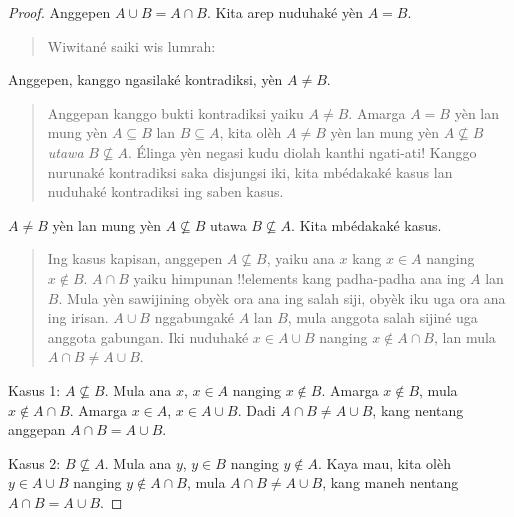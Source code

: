 \documentclass[../../../include/open-logic-section]{subfiles}
\begin{document}
\begin{proof}
  Anggepen $A \cup B = A \cap B$.
  Kita arep nuduhaké yèn $A = B$.
  \begin{quote}
    Wiwitané saiki wis lumrah:
  \end{quote}
  Anggepen, kanggo ngasilaké kontradiksi,
  yèn $A \neq B$.
  \begin{quote}
    Anggepan kanggo bukti kontradiksi yaiku
    $A \neq B$. Amarga $A = B$ yèn lan mung
    yèn $A \subseteq B$ lan $B \subseteq A$,
    kita olèh $A \neq B$ yèn lan mung yèn
    $A \nsubseteq B$ \emph{utawa}
    $B \nsubseteq
    A$. Élinga yèn negasi kudu diolah kanthi
    ngati-ati!{} Kanggo nurunaké kontradiksi
    saka disjungsi iki, kita mbédakaké kasus
    lan nuduhaké kontradiksi ing saben kasus.
  \end{quote}
  $A \neq B$ yèn lan mung yèn $A \nsubseteq B$
  utawa $B \nsubseteq A$. Kita mbédakaké kasus.
  \begin{quote}
    Ing kasus kapisan, anggepen $A \nsubseteq B$,
    yaiku ana $x$ kang $x \in A$ nanging
    $x \notin B$. $A \cap B$ yaiku
    himpunan !!{element}s kang padha-padha
    ana ing $A$ lan $B$. Mula yèn sawijining
    obyèk ora ana ing salah siji, obyèk iku
    uga ora ana ing irisan. $A \cup B$
    nggabungaké $A$ lan $B$, mula anggota
    salah sijiné uga anggota gabungan.
    Iki nuduhaké $x \in A \cup B$ nanging
    $x \notin A \cap
    B$, lan mula $A \cap B \neq A \cup B$.
  \end{quote}


  Kasus 1: $A \nsubseteq B$. Mula ana $x$,
  $x \in A$ nanging $x \notin
  B$. Amarga $x \notin B$, mula
  $x \notin A \cap B$. Amarga $x \in A$,
  $x \in A \cup B$. Dadi
  $A \cap B \neq A \cup B$, kang nentang
  anggepan $A \cap B = A \cup B$.

  Kasus 2: $B \nsubseteq A$. Mula ana $y$,
  $y \in B$ nanging $y \notin
  A$. Kaya mau, kita olèh $y \in A \cup B$
  nanging $y \notin A \cap B$, mula
  $A \cap B \neq A \cup B$, kang maneh
  nentang $A \cap B = A \cup
  B$.
\end{proof}
\end{document}
